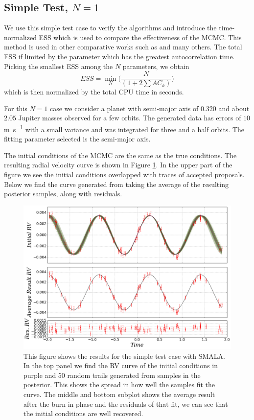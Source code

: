 \documentclass{aa}
\begin{document}
\subsection{Simple Test, $N=1$}
We use this simple test case to verify the algorithms and introduce the time-normalized ESS which is used to compare the effectiveness of the MCMC. This method is used in other comparative works such as \cite{Girolami2011, 1504.01418, Meyer2016, Lan2015} and many others. The total ESS if limited by the parameter which has the greatest autocorrelation time. Picking the smallest ESS among the $N$ parameters, we obtain $$ESS = \min_N\bigg( \frac{N}{(1+2\sum AC_k)}\bigg)$$ which is then normalized by the total CPU time in seconds. 

For this $N=1$ case we consider a planet with semi-major axis of $0.320$ and about $2.05$ Jupiter masses observed for a few orbits. The generated data has errors of $10$ \si{\metre\per\second} with a small variance and was integrated for three and a half orbits. The fitting parameter selected is the semi-major axis.

The initial conditions of the MCMC are the same as the true conditions. The resulting radial velocity curve is shown in Figure \ref{FigSimple}. In the upper part of the figure we see the initial conditions overlapped with traces of accepted proposals. Below we find the curve generated from taking the average of the resulting posterior samples, along with residuals.

\begin{figure}
\centering
\includegraphics[width=0.95\hsize]{rv1-1.png}
   \caption{This figure shows the results for the simple test case with SMALA. In the top panel we find the RV curve of the initial conditions in purple and 50 random trails generated from samples in the posterior. This shows the spread in how well the samples fit the curve. The middle and bottom subplot shows the average result after the burn in phase and the residuals of that fit, we can see that the initial conditions are well recovered.}
      \label{FigSimple}
\end{figure}
\end{document}
